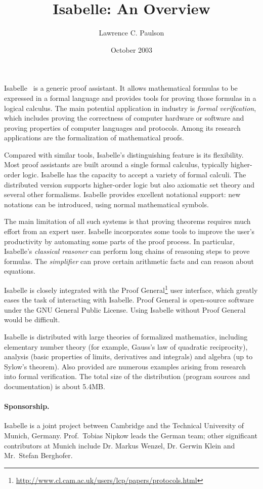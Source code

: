 \documentclass[11pt]{article}
\title{Isabelle: An Overview}
\author{Lawrence C. Paulson}
\date{October 2003}
\newcommand{\hfootref}[2]{#2\footnote{\url{#1}}}}%
\begin{document}
\maketitle


Isabelle~\cite{isa-tutorial} is a generic proof assistant.  It allows mathematical formulas to be expressed in a 
formal language and provides tools for proving those formulas in a
logical calculus. The main potential application in industry is
\emph{formal verification}, which includes proving the 
correctness of computer hardware or software and proving 
properties of computer languages and protocols. Among its research
applications are the formalization of mathematical proofs.

Compared with similar tools, Isabelle's distinguishing feature is its flexibility. Most proof assistants
are built around a single formal calculus, typically higher-order logic.
Isabelle has the capacity to
accept a variety of formal calculi. The distributed version
supports higher-order logic but also axiomatic set theory and several other
formalisms. Isabelle provides excellent notational support: 
new notations can be introduced, using normal mathematical symbols.

The main limitation of all such systems is that proving theorems
requires much effort
from an expert user. Isabelle incorporates some tools to improve
the user's productivity by automating some parts of the proof process.
In particular, Isabelle's \emph{classical reasoner} can perform long
chains of reasoning steps to prove formulas. The \emph{simplifier} 
can prove certain arithmetic facts and can reason about equations.

Isabelle is closely integrated with the 
\hfootref{http://www.cl.cam.ac.uk/users/lcp/papers/protocols.html}{Proof General} user interface, which greatly eases the task of interacting with 
Isabelle. Proof General is open-source software under the GNU General Public
License. Using Isabelle without Proof General would be difficult.

Isabelle is distributed with large theories of formalized mathematics, 
including elementary number theory (for example, Gauss's law of quadratic reciprocity), analysis (basic properties of limits, derivatives and integrals) and algebra (up to Sylow's theorem). Also provided are numerous 
examples arising from research into formal verification. The total size of
the distribution (program sources and documentation) is about 5.4MB.

\paragraph*{Sponsorship.}
Isabelle is a joint project between Cambridge and the Technical University
of Munich, Germany. Prof.\ Tobias Nipkow leads the German team; other significant contributors at Munich include Dr. Markus Wenzel, Dr. Gerwin Klein and Mr.\ Stefan Berghofer.
\end{document}
